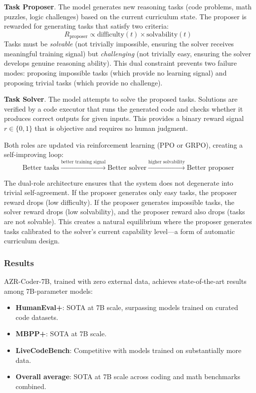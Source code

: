 \textbf{Task Proposer}. The model generates new reasoning tasks (code problems, math puzzles, logic challenges) based on the current curriculum state. The proposer is rewarded for generating tasks that satisfy two criteria:
\begin{equation}
R_{\text{proposer}} \propto \text{difficulty}(t) \times \text{solvability}(t)
\end{equation}
Tasks must be \emph{solvable} (not trivially impossible, ensuring the solver receives meaningful training signal) but \emph{challenging} (not trivially easy, ensuring the solver develops genuine reasoning ability). This dual constraint prevents two failure modes: proposing impossible tasks (which provide no learning signal) and proposing trivial tasks (which provide no challenge).

\textbf{Task Solver}. The model attempts to solve the proposed tasks. Solutions are verified by a code executor that runs the generated code and checks whether it produces correct outputs for given inputs. This provides a binary reward signal $r \in \{0, 1\}$ that is objective and requires no human judgment.

Both roles are updated via reinforcement learning (PPO or GRPO), creating a self-improving loop:
\begin{equation}
\text{Better tasks} \xrightarrow{\text{better training signal}} \text{Better solver} \xrightarrow{\text{higher solvability}} \text{Better proposer}
\end{equation}

The dual-role architecture ensures that the system does not degenerate into trivial self-agreement. If the proposer generates only easy tasks, the proposer reward drops (low difficulty). If the proposer generates impossible tasks, the solver reward drops (low solvability), and the proposer reward also drops (tasks are not solvable). This creates a natural equilibrium where the proposer generates tasks calibrated to the solver's current capability level---a form of automatic curriculum design.

\subsubsection{Results}

AZR-Coder-7B, trained with zero external data, achieves state-of-the-art results among 7B-parameter models:

\begin{itemize}
\item \textbf{HumanEval+}: SOTA at 7B scale, surpassing models trained on curated code datasets.
\item \textbf{MBPP+}: SOTA at 7B scale.
\item \textbf{LiveCodeBench}: Competitive with models trained on substantially more data.
\item \textbf{Overall average}: SOTA at 7B scale across coding and math benchmarks combined.
\end{itemize}

